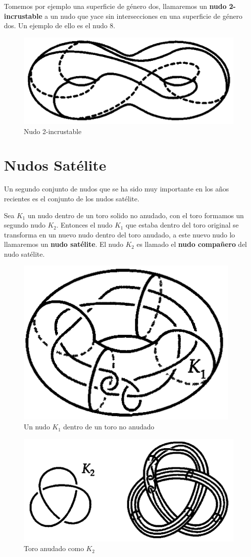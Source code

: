 Tomemos por ejemplo una superficie de género dos, llamaremos un \textbf{nudo 2-incrustable} a un nudo que yace sin intersecciones en una superficie de género dos. Un ejemplo de ello es el nudo 8.

\begin{figure}[ht]
	\centering
	\includegraphics[width=0.35\linewidth]{t8}
	\caption[Nudo 2-incrustable]{Nudo 2-incrustable}
	\label{fig:t8}
\end{figure}

\section{Nudos Satélite}
Un segundo conjunto de nudos que se ha sido muy importante en los años recientes es el conjunto de los nudos satélite.

\begin{defn}\label{dfcp44} Sea $K_1$ un nudo dentro de un toro solido no anudado, con el toro formamos un segundo nudo $K_2$. Entonces el nudo $K_1$ que estaba dentro del toro original se transforma en un nuevo nudo dentro del toro anudado, a este nuevo nudo lo llamaremos un \textbf{nudo satélite}. El nudo $K_2$ es llamado el \textbf{nudo compañero} del nudo satélite.
\end{defn}

\begin{figure}[ht]
	\centering
	\includegraphics[width=0.25\linewidth]{s1}
	\caption[Un nudo $K_1$ dentro de un toro no anudado]{Un nudo $K_1$ dentro de un toro no anudado}
	\label{fig:s1}
\end{figure}

\begin{figure}[ht]
	\centering
	\includegraphics[width=0.4\linewidth]{s2}
	\caption[Toro anudado como $K_2$]{Toro anudado como $K_2$}
	\label{fig:s2}
\end{figure}

